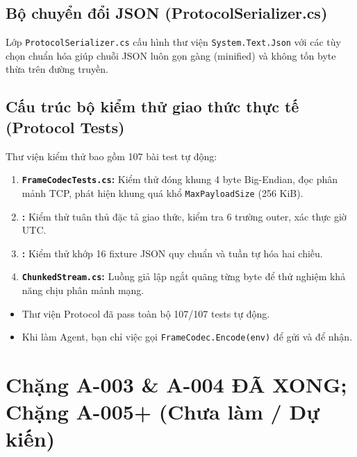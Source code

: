 \documentclass[12pt,a4paper]{article}
\begin{document}
\subsection{Bộ chuyển đổi JSON (ProtocolSerializer.cs)}
Lớp \texttt{ProtocolSerializer.cs} cấu hình thư viện \texttt{System.Text.Json} với các tùy chọn chuẩn hóa giúp chuỗi JSON luôn gọn gàng (minified) và không tốn byte thừa trên đường truyền.

\subsection{Cấu trúc bộ kiểm thử giao thức thực tế (Protocol Tests)}
Thư viện kiểm thử  bao gồm 107 bài test tự động:
\begin{enumerate}
  \item \textbf{\texttt{FrameCodecTests.cs}:} Kiểm thử đóng khung 4 byte Big-Endian, đọc phân mảnh TCP, phát hiện khung quá khổ \texttt{MaxPayloadSize} (256 KiB).
  \item \textbf{:} Kiểm thử tuân thủ đặc tả giao thức, kiểm tra 6 trường outer, xác thực giờ UTC.
  \item \textbf{:} Kiểm thử khớp 16 fixture JSON quy chuẩn và tuần tự hóa hai chiều.
  \item \textbf{\texttt{ChunkedStream.cs}:} Luồng giả lập ngắt quãng từng byte để thử nghiệm khả năng chịu phân mảnh mạng.
\end{enumerate}

\begin{takeawaybox}
\begin{itemize}[leftmargin=1.5em, itemsep=1pt]
  \item Thư viện Protocol đã pass toàn bộ 107/107 tests tự động.
  \item Khi làm Agent, bạn chỉ việc gọi \texttt{FrameCodec.Encode(env)} để gửi và  để nhận.
\end{itemize}
\end{takeawaybox}

\section[Các chặng công việc máy trạm Agent]{Chặng A-003 \& A-004 ĐÃ XONG; Chặng A-005+ (Chưa làm / Dự kiến)}
\end{document}
